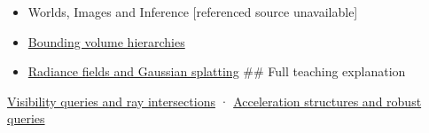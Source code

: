\begin{itemize}
\item
  {Worlds, Images and Inference {[}referenced source unavailable{]}}
\item
  \hyperref[appendix-0b426c47dd78]{Bounding volume hierarchies}
\item
  \hyperref[appendix-c5b332e400e7]{Radiance fields and Gaussian splatting} \#\# Full teaching explanation
\end{itemize}

\hyperref[04-visual-computing-ii-ch028-visibility-queries-and-ray-intersections-1]{Visibility queries and ray intersections} · \hyperref[04-visual-computing-ii-ch029-acceleration-structures-and-robust-queries-1]{Acceleration structures and robust queries}
